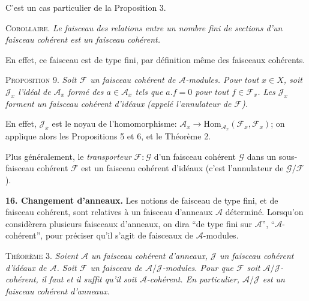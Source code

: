 C'est un cas particulier de la Proposition 3.

\textsc{Corollaire}. \textit{Le faisceau des relations entre un nombre fini de sections d'un faisceau cohérent est un faisceau cohérent.}

En effet, ce faisceau est de type fini, par définition même des faisceaux cohérents.

\textsc{Proposition} 9. \textit{Soit $\mathcal{F}$ un faisceau cohérent de $\mathcal{A}$-modules. Pour tout $x \in X$, soit $\mathcal{J}_x$ l'idéal de $\mathcal{A}_x$ formé des $a \in \mathcal{A}_x$ tels que $a . f = 0$ pour tout $f \in \mathcal{F}_x$. Les $\mathcal{J}_x$ forment un faisceau cohérent d'idéaux (appelé l'annulateur de $\mathcal{F}$).}

En effet, $\mathcal{J}_x$ est le noyau de l'homomorphisme: $\mathcal{A}_x \to \mathrm{Hom}_{\mathcal{A}_x}(\mathcal{F}_x , \mathcal{F}_x)$; on applique alors les Propositions 5 et 6, et le Théorème 2.

Plus généralement, le \textit{transporteur} $\mathcal{F} : \mathcal{G}$ d'un faisceau cohérent $\mathcal{G}$ dans un sous-faisceau cohérent $\mathcal{F}$ est un faisceau cohérent d'idéaux (c'est l'annulateur de $\mathcal{G}/\mathcal{F}$).

\textbf{16. Changement d'anneaux.} Les notions de faisceau de type fini, et de faisceau cohérent, sont relatives à un faisceau d'anneaux $\mathcal{A}$ déterminé. Lorsqu'on considèrera plusieurs faisceaux d'anneaux, on dira ``de type fini sur $\mathcal{A}$'', ``$\mathcal{A}$-cohérent'', pour préciser qu'il s'agit de faisceaux de $\mathcal{A}$-modules.

\textsc{Théorème} 3. \textit{Soient $\mathcal{A}$ un faisceau cohérent d'anneaux, $\mathcal{J}$ un faisceau cohérent d'idéaux de $\mathcal{A}$. Soit $\mathcal{F}$ un faisceau de $\mathcal{A}/\mathcal{J}$-modules. Pour que $\mathcal{F}$ soit $\mathcal{A}/\mathcal{J}$-cohérent, il faut et il suffit qu'il soit $\mathcal{A}$-cohérent. En particulier, $\mathcal{A}/\mathcal{J}$ est un faisceau cohérent d'anneaux.}

